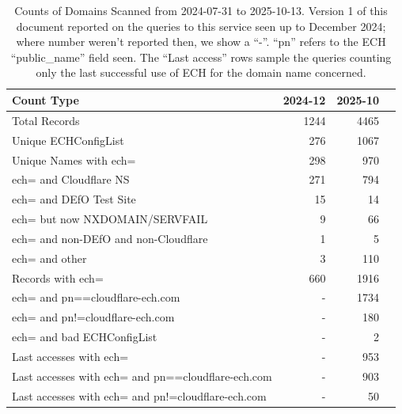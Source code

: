 \begin{table} 
    \centering
        \caption{Counts of Domains Scanned from 2024-07-31 to 2025-10-13.
                 Version 1 of this document reported on the
                 queries to this service seen up to December 2024; where
                 number weren't reported then, we show a ``-''. ``pn'' refers
                 to the ECH ``public\_name'' field seen. The ``Last access'' rows
                 sample the queries counting only the last successful use of ECH
                 for the domain name concerned.}
		\begin{tabular} { | l | r | r | c | }
		\hline
		\hline Count Type & 2024-12 & 2025-10 \\
		\hline
            \hline Total Records & 1244 & 4465 \\
            \hline Unique ECHConfigList & 276 & 1067 \\
		\hline
            \hline Unique Names with ech= & 298 & 970 \\
            \hline ech= and Cloudflare NS & 271 & 794 \\
            \hline ech= and DEfO Test Site & 15 & 14 \\
            \hline ech= but now NXDOMAIN/SERVFAIL & 9 & 66 \\
            \hline ech= and non-DEfO and non-Cloudflare & 1 & 5 \\
            \hline ech= and other & 3 & 110 \\
		\hline
            \hline Records with ech= & 660 & 1916 \\
            \hline ech= and pn==cloudflare-ech.com & - & 1734 \\
            \hline ech= and pn!=cloudflare-ech.com & - & 180 \\
            \hline ech= and bad ECHConfigList & - & 2 \\
        \hline
            \hline Last accesses with ech= & - & 953 \\
            \hline Last accesses with ech= and pn==cloudflare-ech.com & - & 903 \\
            \hline Last accesses with ech= and pn!=cloudflare-ech.com & - & 50 \\
        \hline
		\end{tabular}
	\label{tab:domainprobe}
\end{table}

